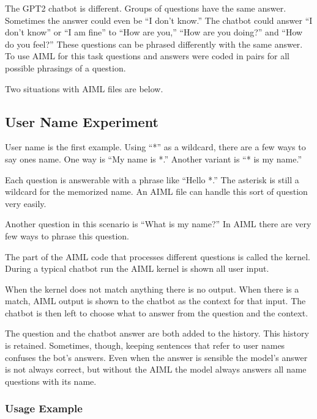 The GPT2 chatbot is different. Groups of questions have the same answer. Sometimes the answer could even be ``I don't know.'' The chatbot could answer ``I don't know'' or ``I am fine'' to  ``How are you,''  ``How are you doing?'' and ``How do you feel?'' These questions can be phrased differently with the same answer. To use AIML for this task questions and answers were coded in pairs for all possible phrasings of a question.

Two situations with AIML files are below.

\subsection{User Name Experiment}
User name is the first example. Using ``*'' as a wildcard, there are a few ways to say ones name. One way is ``My name is *.'' Another variant is ``* is my name.'' %

Each question is answerable with a phrase like ``Hello *.'' The asterisk is still a wildcard for the memorized name. An AIML file can handle this sort of question very easily. 

Another question in this scenario is ``What is my name?'' In AIML there are very few ways to phrase this question. 

The part of the AIML code that processes different questions is called the kernel.
During a typical chatbot run the AIML kernel is shown all user input.%

When the kernel does not match anything there is no output. When there is a match, AIML output is shown to the chatbot as the context for that input. The chatbot is then left to choose what to answer from the question and the context. 

The question and the chatbot answer are both added to the history. 
This history is retained. Sometimes, though, keeping sentences that refer to user names confuses the bot's answers. Even when the answer is sensible the model's answer is not always correct, but without the AIML the model always answers all name questions with its name. 


\subsubsection{Usage Example}

